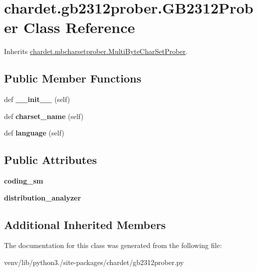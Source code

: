 \hypertarget{classchardet_1_1gb2312prober_1_1_g_b2312_prober}{}\section{chardet.\+gb2312prober.\+G\+B2312\+Prober Class Reference}
\label{classchardet_1_1gb2312prober_1_1_g_b2312_prober}


Inherits \hyperlink{classchardet_1_1mbcharsetprober_1_1_multi_byte_char_set_prober}{chardet.\+mbcharsetprober.\+Multi\+Byte\+Char\+Set\+Prober}.

\subsection*{Public Member Functions}
\begin{DoxyCompactItemize}
\item 
\mbox{\label{classchardet_1_1gb2312prober_1_1_g_b2312_prober_a87d0a8ba6dc44051ae03bd1e266c5e17}} 
def {\bfseries \+\_\+\+\_\+init\+\_\+\+\_\+} (self)
\item 
\mbox{\label{classchardet_1_1gb2312prober_1_1_g_b2312_prober_acca4a6c29ee6182457f2d05b163fc794}} 
def {\bfseries charset\+\_\+name} (self)
\item 
\mbox{\label{classchardet_1_1gb2312prober_1_1_g_b2312_prober_a609294096dce1efdf700e81549a29ade}} 
def {\bfseries language} (self)
\end{DoxyCompactItemize}
\subsection*{Public Attributes}
\begin{DoxyCompactItemize}
\item 
\mbox{\label{classchardet_1_1gb2312prober_1_1_g_b2312_prober_a42143ca081e02a40fa50735a9c4c30b9}} 
{\bfseries coding\+\_\+sm}
\item 
\mbox{\label{classchardet_1_1gb2312prober_1_1_g_b2312_prober_a410897d500f82e5015ec0ec4aa0a215b}} 
{\bfseries distribution\+\_\+analyzer}
\end{DoxyCompactItemize}
\subsection*{Additional Inherited Members}


The documentation for this class was generated from the following file\+:\begin{DoxyCompactItemize}
\item 
venv/lib/python3./site-\/packages/chardet/gb2312prober.\+py\end{DoxyCompactItemize}
